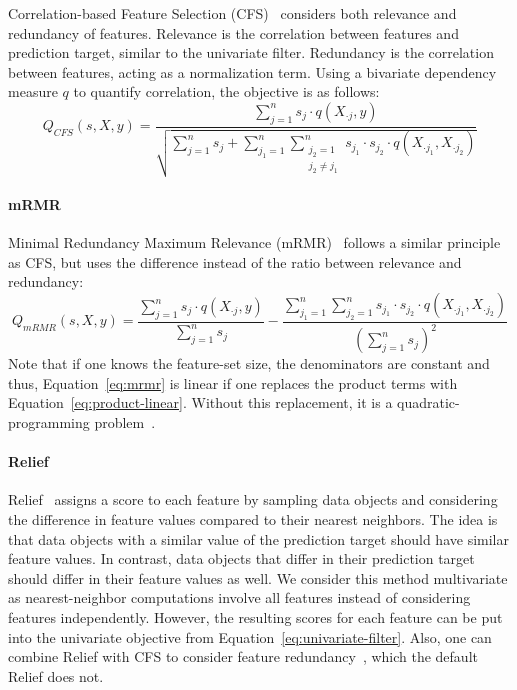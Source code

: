 \documentclass{article}
\theoremstyle{definition}
\begin{document}
Correlation-based Feature Selection (CFS)~\cite{hall1999correlation} considers both relevance and redundancy of features.
Relevance is the correlation between features and prediction target, similar to the univariate filter.
Redundancy is the correlation between features, acting as a normalization term.
Using a bivariate dependency measure $q$ to quantify correlation, the objective is as follows:
%
\begin{equation}
	Q_{CFS}(s,X,y) = \frac{\sum_{j=1}^{n} s_j \cdot q(X_{\cdot{}j},y)}{\sqrt{\sum_{j=1}^{n} s_j + \sum_{j_1=1}^{n} \sum_{\substack{j_2=1 \\ j_2 \neq j_1}}^{n} s_{j_1} \cdot s_{j_2} \cdot q(X_{\cdot{}j_1}, X_{\cdot{}j_2})}}
	\label{eq:cfs}
\end{equation}
%
\paragraph{mRMR}

Minimal Redundancy Maximum Relevance (mRMR)~\cite{peng2005feature} follows a similar principle as CFS, but uses the difference instead of the ratio between relevance and redundancy:
%
\begin{equation}
	Q_{mRMR}(s,X,y) = \frac{\sum_{j=1}^{n} s_j \cdot q(X_{\cdot{}j},y)}{\sum_{j=1}^{n} s_j} - \frac{\sum_{j_1=1}^{n} \sum_{j_2=1}^{n} s_{j_1} \cdot s_{j_2} \cdot q(X_{\cdot{}j_1}, X_{\cdot{}j_2})}{(\sum_{j=1}^{n} s_j)^2}
	\label{eq:mrmr}
\end{equation}
%
Note that if one knows the feature-set size, the denominators are constant and thus, Equation~\ref{eq:mrmr} is linear if one replaces the product terms with Equation~\ref{eq:product-linear}.
Without this replacement, it is a quadratic-programming problem~\cite{rodriguez2010quadratic, nguyen2014effective}.

\paragraph{Relief}

Relief~\cite{kira1992feature} assigns a score to each feature by sampling data objects and considering the difference in feature values compared to their nearest neighbors.
The idea is that data objects with a similar value of the prediction target should have similar feature values.
In contrast, data objects that differ in their prediction target should differ in their feature values as well.
We consider this method multivariate as nearest-neighbor computations involve all features instead of considering features independently.
However, the resulting scores for each feature can be put into the univariate objective from Equation~\ref{eq:univariate-filter}.
Also, one can combine Relief with CFS to consider feature redundancy~\cite{hall1999correlation}, which the default Relief does not.

\renewcommand*{\bibfont}{\small} %
\printbibliography
\end{document}
